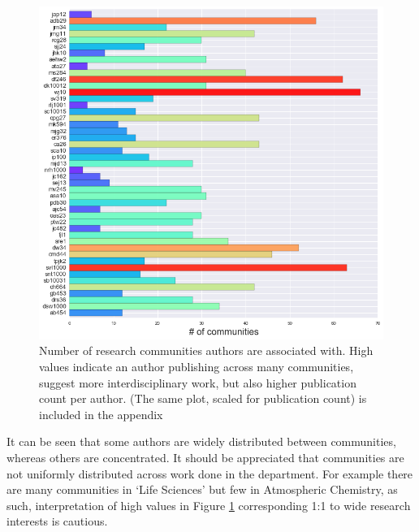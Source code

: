 \begin{center}
\begin{figure}[H]
\label{fig:commbar}
  \centering
    \includegraphics[scale=0.8]{Analysis/community_detection.png}
    \caption{Number of research communities authors are associated with. High values indicate an author publishing across many communities, suggest more interdisciplinary work, but also higher publication count per author. (The same plot, scaled for publication count) is included in the appendix}
\end{figure} 
\end{center}
It can be seen that some authors are widely distributed between communities, whereas others are concentrated.
It should be appreciated that communities are not uniformly distributed across work done in the department. For example there are many communities in `Life Sciences' but few in Atmospheric Chemistry, as such, interpretation of high values in Figure \ref{fig:commbar} corresponding 1:1 to wide research interests is cautious.

